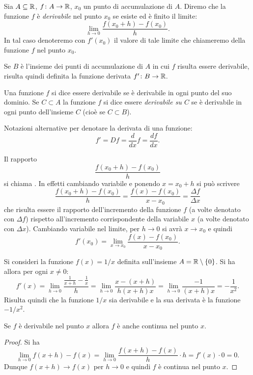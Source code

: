 \begin{definition}[derivata]
\mymark{***}%
Sia $A\subseteq \mathbb R$, $f\colon A \to \mathbb R$, $x_0$ un punto di accumulazione di $A$.
Diremo che la funzione $f$ è \emph{derivabile} nel punto $x_0$ se esiste
ed è finito il limite:
\[
  \lim_{h\to 0} \frac{f(x_0+h) - f(x_0)}{h}.
\]
In tal caso denoteremo con $f'(x_0)$ il valore di tale limite che chiameremo
 della funzione $f$ nel punto $x_0$.

Se $B$ è l'insieme dei punti di accumulazione di $A$ in cui $f$ risulta essere derivabile, risulta quindi definita la funzione derivata $f'\colon B \to \mathbb R$.

Una funzione $f$ si dice essere derivabile se è derivabile in ogni punto del suo dominio.
Se $C\subset A$ la funzione $f$ si dice essere \emph{derivabile su $C$} se è derivabile in ogni punto dell'insieme $C$ (cioè se $C\subset B$).

Notazioni alternative per denotare la derivata di una funzione:
\[
  f' = Df = \frac{d}{dx} f = \frac{df}{dx}.
\]
\end{definition}

Il rapporto
\[
\frac{f(x_0+h) - f(x_0)}{h}
\]
si chiama . In effetti cambiando variabile e ponendo $x=x_0+h$ si può scrivere
\[
\frac{f(x_0+h) - f(x_0)}{h}
= \frac{f(x) - f(x_0)}{x-x_0}
= \frac{\Delta f}{\Delta x}
\]
che risulta essere il rapporto dell'incremento della funzione $f$ (a volte denotato con $\Delta f$) rispetto all'incremento corrispondente della variabile $x$ (a volte denotato con $\Delta x$).
Cambiando variabile nel limite, per $h\to 0$ si avrà $x\to x_0$
e quindi
\[
 f'(x_0) = \lim_{x\to x_0} \frac{f(x)-f(x_0)}{x-x_0}.
\]

\begin{example}
\mymark{**}
Si consideri la funzione $f(x) = 1/x$ definita sull'insieme $A = \mathbb R \setminus {\left\{ 0 \right\}}$. Si ha allora per ogni $x\neq 0$:
\[
  f'(x) = \lim_{h\to 0} \frac{\frac{1}{x+h} - \frac{1}{x}}{h}
        = \lim_{h\to 0} \frac{x - (x+h)}{h(x+h)x}
        = \lim_{h\to 0} \frac{-1}{(x+h)x} = -\frac{1}{x^2}.
\]
Risulta quindi che la funzione $1/x$ sia derivabile e la sua derivata è la funzione $-1/x^2$.
\end{example}

\begin{theorem}
\mymark{***}
Se $f$ è derivabile nel punto $x$ allora $f$ è anche continua nel punto $x$.
\end{theorem}
%
\begin{proof}
\mymark{***}
Si ha
\[
  \lim_{h\to 0} f(x+h) - f(x) = \lim_{h\to 0} \frac{f(x+h) - f(x)}{h} \cdot h
  = f'(x) \cdot 0 = 0.
\]
Dunque $f(x+h)\to f(x)$ per $h\to 0$ e quindi $f$ è continua nel punto $x$.
\end{proof}

